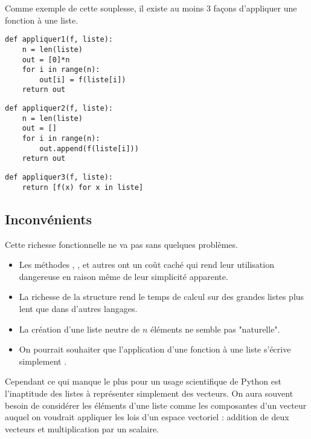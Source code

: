 Comme exemple de cette souplesse, il existe au moins 3 façons d'appliquer une fonction à une liste.

\begin{lstlisting}
def appliquer1(f, liste):
    n = len(liste)
    out = [0]*n
    for i in range(n):
        out[i] = f(liste[i])
    return out
\end{lstlisting}

\begin{lstlisting}
def appliquer2(f, liste):
    n = len(liste)
    out = []
    for i in range(n):
        out.append(f(liste[i]))
    return out
\end{lstlisting}

\begin{lstlisting}
def appliquer3(f, liste):
    return [f(x) for x in liste]
\end{lstlisting}
\newpage
\subsection{Inconvénients}
Cette richesse fonctionnelle ne va pas sans quelques  problèmes.

\begin{itemize}
\item Les méthodes  , ,  et autres ont un coût caché qui rend leur utilisation dangereuse en raison même de leur simplicité apparente.
\item La richesse de la structure rend le temps de calcul sur des grandes listes plus lent que dans d'autres langages.
\item La création d'une liste neutre de $n$ éléments ne semble pas "naturelle".
\item On pourrait souhaiter que l'application d'une fonction à une liste s'écrive simplement .
\end{itemize}

Cependant ce qui manque le plus pour un usage scientifique de Python est l'inaptitude des listes à représenter simplement des vecteurs. On aura souvent besoin de considérer les éléments d'une liste comme les composantes d'un vecteur auquel on voudrait appliquer les lois d'un espace vectoriel : addition de deux vecteurs et multiplication par un scalaire.
